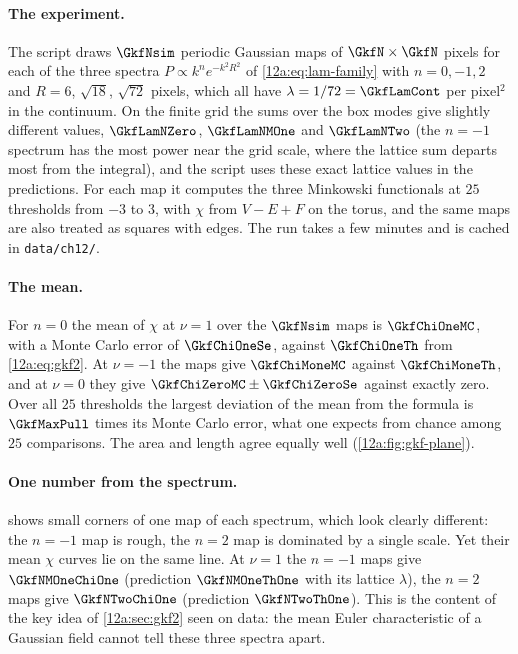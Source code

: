 \paragraph{The experiment.} The script  draws $\GkfNsim$ periodic Gaussian
maps of $\GkfN\times\GkfN$ pixels for each of the three spectra $P\propto k^ne^{-k^2R^2}$ of
\eqref{12a:eq:lam-family} with $n=0,-1,2$ and $R=6$, $\sqrt{18}$, $\sqrt{72}$ pixels, which all have
$\lambda=1/72=\GkfLamCont$ per pixel$^2$ in the continuum. On the finite grid the sums over the box modes give
slightly different values, $\GkfLamNZero$, $\GkfLamNMOne$ and $\GkfLamNTwo$ (the $n=-1$ spectrum has the most
power near the grid scale, where the lattice sum departs most from the integral), and the script uses these
exact lattice values in the predictions. For each map it computes the three Minkowski functionals at $25$
thresholds from $-3$ to $3$, with $\chi$ from $V-E+F$ on the torus, and the same maps are also treated as
squares with edges. The run takes a few minutes and is cached in \texttt{data/ch12/}.

\paragraph{The mean.} For $n=0$ the mean of $\chi$ at $\nu=1$ over the $\GkfNsim$ maps is $\GkfChiOneMC$, with a
Monte Carlo error of $\GkfChiOneSe$, against $\GkfChiOneTh$ from \eqref{12a:eq:gkf2}. At $\nu=-1$ the maps give
$\GkfChiMoneMC$ against $\GkfChiMoneTh$, and at $\nu=0$ they give $\GkfChiZeroMC\pm\GkfChiZeroSe$ against
exactly zero. Over all $25$ thresholds the largest deviation of the mean from the formula is $\GkfMaxPull$
times its Monte Carlo error, what one expects from chance among $25$ comparisons. The area and length agree
equally well (\cref{12a:fig:gkf-plane}).

\paragraph{One number from the spectrum.}  shows small corners of one map of each
spectrum, which look clearly different: the $n=-1$ map is rough, the $n=2$ map is dominated by a single
scale. Yet their mean $\chi$ curves lie on the same line. At $\nu=1$ the $n=-1$ maps give $\GkfNMOneChiOne$
(prediction $\GkfNMOneThOne$ with its lattice $\lambda$), the $n=2$ maps give $\GkfNTwoChiOne$ (prediction
$\GkfNTwoThOne$). This is the content of the key idea of \cref{12a:sec:gkf2} seen on data: the mean Euler
characteristic of a Gaussian field cannot tell these three spectra apart.

